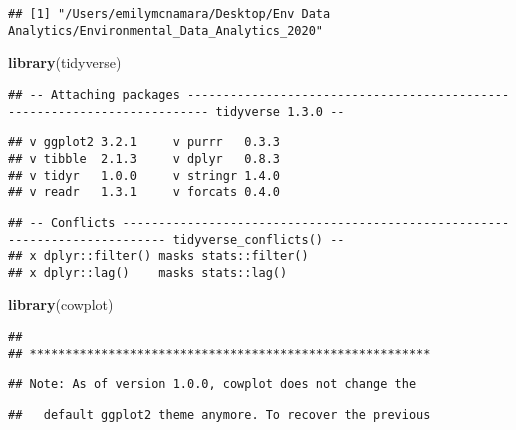 \documentclass[]{article}
\newenvironment{Shaded}{\begin{snugshade}}{\end{snugshade}}
\newcommand{\KeywordTok}[1]{\textcolor[rgb]{0.13,0.29,0.53}{\textbf{#1}}}
\newcommand{\CommentTok}[1]{\textcolor[rgb]{0.56,0.35,0.01}{\textit{#1}}}
\newcommand{\NormalTok}[1]{#1}
\begin{document}
\begin{Shaded}
\end{Shaded}

\begin{verbatim}
## [1] "/Users/emilymcnamara/Desktop/Env Data Analytics/Environmental_Data_Analytics_2020"
\end{verbatim}

\begin{Shaded}
\begin{Highlighting}[]
\KeywordTok{library}\NormalTok{(tidyverse)}
\end{Highlighting}
\end{Shaded}

\begin{verbatim}
## -- Attaching packages ------------------------------------------------------------------------- tidyverse 1.3.0 --
\end{verbatim}

\begin{verbatim}
## v ggplot2 3.2.1     v purrr   0.3.3
## v tibble  2.1.3     v dplyr   0.8.3
## v tidyr   1.0.0     v stringr 1.4.0
## v readr   1.3.1     v forcats 0.4.0
\end{verbatim}

\begin{verbatim}
## -- Conflicts ---------------------------------------------------------------------------- tidyverse_conflicts() --
## x dplyr::filter() masks stats::filter()
## x dplyr::lag()    masks stats::lag()
\end{verbatim}

\begin{Shaded}
\begin{Highlighting}[]
\KeywordTok{library}\NormalTok{(cowplot)}
\end{Highlighting}
\end{Shaded}

\begin{verbatim}
## 
## ********************************************************
\end{verbatim}

\begin{verbatim}
## Note: As of version 1.0.0, cowplot does not change the
\end{verbatim}

\begin{verbatim}
##   default ggplot2 theme anymore. To recover the previous
\end{verbatim}
\end{document}
